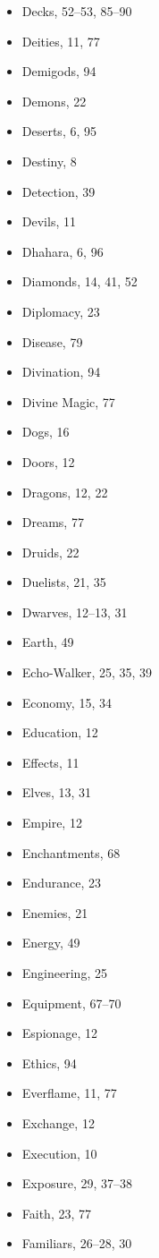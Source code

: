 \begin{multicols}{2}
\begin{itemize}
  \item Decks, 52--53, 85--90
  \item Deities, 11, 77
  \item Demigods, 94
  \item Demons, 22
  \item Deserts, 6, 95
  \item Destiny, 8
  \item Detection, 39
  \item Devils, 11
  \item Dhahara, 6, 96
  \item Diamonds, 14, 41, 52
  \item Diplomacy, 23
  \item Disease, 79
  \item Divination, 94
  \item Divine Magic, 77
  \item Dogs, 16
  \item Doors, 12
  \item Dragons, 12, 22
  \item Dreams, 77
  \item Druids, 22
  \item Duelists, 21, 35
  \item Dwarves, 12--13, 31
  \item Earth, 49
  \item Echo-Walker, 25, 35, 39
  \item Economy, 15, 34
  \item Education, 12
  \item Effects, 11
  \item Elves, 13, 31
  \item Empire, 12
  \item Enchantments, 68
  \item Endurance, 23
  \item Enemies, 21
  \item Energy, 49
  \item Engineering, 25
  \item Equipment, 67--70
  \item Espionage, 12
  \item Ethics, 94
  \item Everflame, 11, 77
  \item Exchange, 12
  \item Execution, 10
  \item Exposure, 29, 37--38
  \item Faith, 23, 77
  \item Familiars, 26--28, 30

\end{itemize}
\end{multicols}
